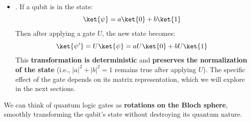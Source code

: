 \begin{itemize}
    Finally, this property is related to fundamental principles such as the \textbf{no-cloning theorem} (, ) and the \textbf{no-deleting theorem} (we cannot delete quantum information arbitrarily, since it is preserved under unitary transformations, ).


    \item {}. If a qubit is in the state:
    \begin{equation*}
        \ket{\psi} = a\ket{0} + b\ket{1}
    \end{equation*}
    Then after applying a gate $U$, the new state becomes:
    \begin{equation*}
        \ket{\psi'} = U\ket{\psi} = aU\ket{0} + bU\ket{1}
    \end{equation*}
    This \textbf{transformation is deterministic} and \textbf{preserves the normalization of the state} (i.e., $\left|a\right|^2 + \left|b\right|^2 = 1$ remains true after applying $U$). The specific effect of the gate depends on its matrix representation, which we will explore in the next sections.
\end{itemize}
We can think of quantum logic gates as \textbf{rotations on the Bloch sphere}, smoothly transforming the qubit's state without destroying its quantum nature.

